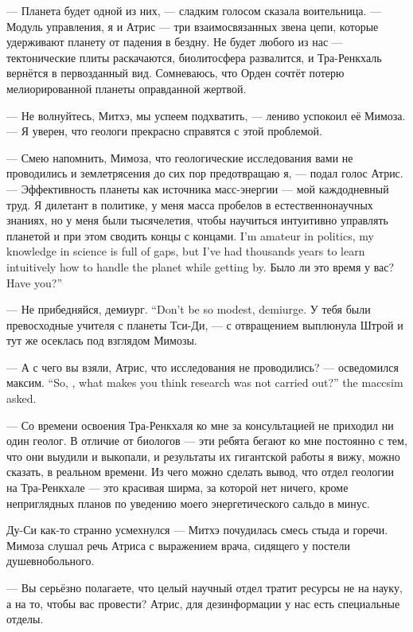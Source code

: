 --- Планета будет одной из них, --- сладким голосом сказала воительница.
--- Модуль управления, я и Атрис --- три взаимосвязанных звена цепи, которые удерживают планету от падения в бездну.
Не будет любого из нас --- тектонические плиты раскачаются, биолитосфера развалится, и Тра-Ренкхаль вернётся в первозданный вид.
Сомневаюсь, что Орден сочтёт потерю мелиорированной планеты оправданной жертвой.

--- Не волнуйтесь, Митхэ, мы успеем подхватить, --- лениво успокоил её Мимоза.
--- Я уверен, что геологи прекрасно справятся с этой проблемой.

--- Смею напомнить, Мимоза, что геологические исследования вами не проводились и землетрясения до сих пор предотвращаю я, --- подал голос Атрис.
--- Эффективность планеты как источника масс-энергии --- мой каждодневный труд.
{Я дилетант в политике, у меня масса пробелов в естественнонаучных знаниях, но у меня были тысячелетия, чтобы научиться интуитивно управлять планетой и при этом сводить концы с концами.}
{I'm amateur in politics, my knowledge in science is full of gaps, but I've had thousands years to learn intuitively how to handle the planet while getting by.}
{Было ли это время у вас?}
{Have you?''}

{--- Не прибедняйся, демиург.}
{``Don't be so modest, demiurge.}
У тебя были превосходные учителя с планеты Тси-Ди, --- с отвращением выплюнула Штрой и тут же осеклась под взглядом Мимозы.

{--- А с чего вы взяли, Атрис, что исследования не проводились? --- осведомился максим.}
{``So, \Aatris{}, what makes you think research was not carried out?'' the maccsim asked.}

--- Со времени освоения Тра-Ренкхаля ко мне за консультацией не приходил ни один геолог.
В отличие от биологов --- эти ребята бегают ко мне постоянно с тем, что они выудили и выкопали, и результаты их гигантской работы я вижу, можно сказать, в реальном времени.
Из чего можно сделать вывод, что отдел геологии на Тра-Ренкхале --- это красивая ширма, за которой нет ничего, кроме неприглядных планов по уведению моего энергетического сальдо в минус.

Ду-Си как-то странно усмехнулся --- Митхэ почудилась смесь стыда и горечи.
Мимоза слушал речь Атриса с выражением врача, сидящего у постели душевнобольного.

--- Вы серьёзно полагаете, что целый научный отдел тратит ресурсы не на науку, а на то, чтобы вас провести?
Атрис, для дезинформации у нас есть специальные отделы.

